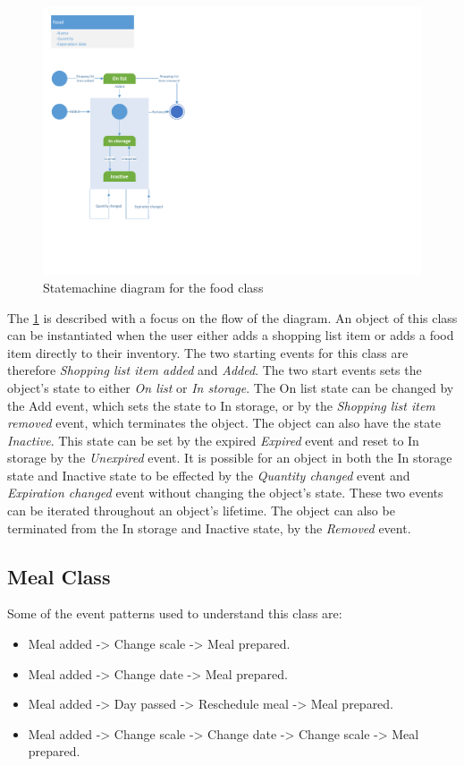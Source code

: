 \begin{figure}[tbhp]
	\centering
	\includegraphics[clip=true, trim=0.5cm 4cm 18.5cm 0.5cm,  ]{Development/ProblemDomain/FoodClass.pdf}
	\caption{Statemachine diagram for the food class} \label{FoodClass}
\end{figure}
The \cref{FoodClass} is described with a focus on the flow of the diagram.
An object of this class can be instantiated when the user either adds a shopping list item or adds a food item directly to their inventory. The two starting events for this class are therefore \textit{Shopping list item added} and \textit{Added}. The two start events sets the object's state to either \textit{On list} or \textit{In storage}. The On list state can be changed by the Add event, which sets the state to In storage, or by the \textit{Shopping list item removed} event, which terminates the object. The object can also have the state \textit{Inactive}. This state can be set by the expired \textit{Expired} event and reset to In storage by the \textit{Unexpired} event. It is possible for an object in both the In storage state and Inactive state to be effected by the \textit{Quantity changed} event and \textit{Expiration changed} event without changing the object's state. These two events can be iterated throughout an object's lifetime. The object can also be terminated from the In storage and Inactive state, by the \textit{Removed} event.   

\subsection{Meal Class}
Some of the event patterns used to understand this class are:
\begin{itemize}
	\item Meal added -> Change scale -> Meal prepared.
	\item Meal added -> Change date -> Meal prepared.
	\item Meal added -> Day passed -> Reschedule meal -> Meal prepared.
	\item Meal added -> Change scale -> Change date -> Change scale -> Meal prepared.
\end{itemize}

